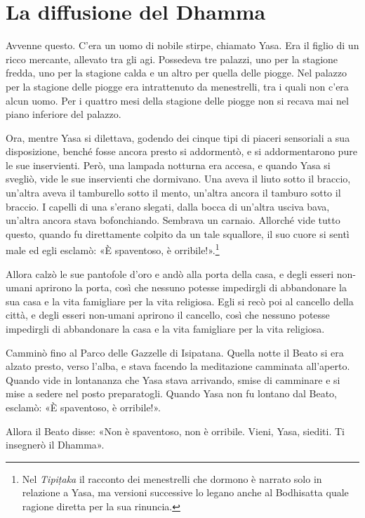 \chapter{La diffusione del Dhamma}

 Avvenne questo. C’era un uomo di nobile stirpe, chiamato
Yasa. Era il figlio di un ricco mercante, allevato tra gli agi.
Possedeva tre palazzi, uno per la stagione fredda, uno per la stagione
calda e un altro per quella delle piogge. Nel palazzo per la stagione
delle piogge era intrattenuto da menestrelli, tra i quali non c’era
alcun uomo. Per i quattro mesi della stagione delle piogge non si recava
mai nel piano inferiore del palazzo.


Ora, mentre Yasa si dilettava, godendo dei cinque tipi di piaceri
sensoriali a sua disposizione, benché fosse ancora presto si addormentò,
e si addormentarono pure le sue inservienti. Però, una lampada notturna
era accesa, e quando Yasa si svegliò, vide le sue inservienti che
dormivano. Una aveva il liuto sotto il braccio, un’altra aveva il
tamburello sotto il mento, un’altra ancora il tamburo sotto il braccio.
I capelli di una s’erano slegati, dalla bocca di un’altra usciva bava,
un’altra ancora stava bofonchiando. Sembrava un carnaio. Allorché vide
tutto questo, quando fu direttamente colpito da un tale squallore, il
suo cuore si sentì male ed egli esclamò: «È spaventoso, è
orribile!».\footnote{Nel \emph{Tipiṭaka} il racconto dei menestrelli che dormono è narrato solo in relazione a Yasa, ma versioni successive lo legano anche al Bodhisatta quale ragione diretta per la sua rinuncia.}


Allora calzò le sue pantofole d’oro e andò alla porta della casa, e
degli esseri non-umani aprirono la porta, così che nessuno potesse
impedirgli di abbandonare la sua casa e la vita famigliare per la vita
religiosa. Egli si recò poi al cancello della città, e degli esseri
non-umani aprirono il cancello, così che nessuno potesse impedirgli di
abbandonare la casa e la vita famigliare per la vita religiosa.


Camminò fino al Parco delle Gazzelle di Isipatana. Quella notte il Beato
si era alzato presto, verso l’alba, e stava facendo la meditazione
camminata all’aperto. Quando vide in lontananza che Yasa stava
arrivando, smise di camminare e si mise a sedere nel posto preparatogli.
Quando Yasa non fu lontano dal Beato, esclamò: «È spaventoso, è
orribile!».


Allora il Beato disse: «Non è spaventoso, non è orribile. Vieni, Yasa,
siediti. Ti insegnerò il Dhamma».


